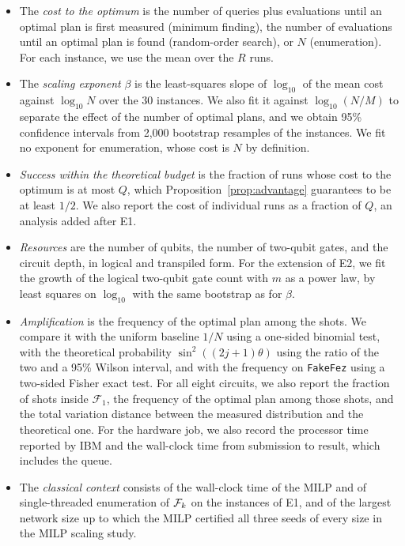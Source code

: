 \begin{itemize}
\item The \emph{cost to the optimum} is the number of queries plus evaluations until an optimal plan is first measured (minimum finding), the number of evaluations until an optimal plan is found (random-order search), or $N$ (enumeration). For each instance, we use the mean over the $R$ runs.
\item The \emph{scaling exponent} $\beta$ is the least-squares slope of $\log_{10}$ of the mean cost against $\log_{10}N$ over the 30 instances. We also fit it against $\log_{10}(N/M)$ to separate the effect of the number of optimal plans, and we obtain 95\% confidence intervals from 2{,}000 bootstrap resamples of the instances. We fit no exponent for enumeration, whose cost is $N$ by definition.
\item \emph{Success within the theoretical budget} is the fraction of runs whose cost to the optimum is at most $Q$, which Proposition~\ref{prop:advantage} guarantees to be at least $1/2$. We also report the cost of individual runs as a fraction of $Q$, an analysis added after E1.
\item \emph{Resources} are the number of qubits, the number of two-qubit gates, and the circuit depth, in logical and transpiled form. For the extension of E2, we fit the growth of the logical two-qubit gate count with $m$ as a power law, by least squares on $\log_{10}$ with the same bootstrap as for $\beta$.
\item \emph{Amplification} is the frequency of the optimal plan among the shots. We compare it with the uniform baseline $1/N$ using a one-sided binomial test, with the theoretical probability $\sin^2((2j+1)\theta)$ using the ratio of the two and a 95\% Wilson interval, and with the frequency on \texttt{FakeFez} using a two-sided Fisher exact test. For all eight circuits, we also report the fraction of shots inside $\mathcal{F}_1$, the frequency of the optimal plan among those shots, and the total variation distance between the measured distribution and the theoretical one. For the hardware job, we also record the processor time reported by IBM and the wall-clock time from submission to result, which includes the queue.
\item The \emph{classical context} consists of the wall-clock time of the MILP and of single-threaded enumeration of $\mathcal{F}_k$ on the instances of E1, and of the largest network size up to which the MILP certified all three seeds of every size in the MILP scaling study.
\end{itemize}

